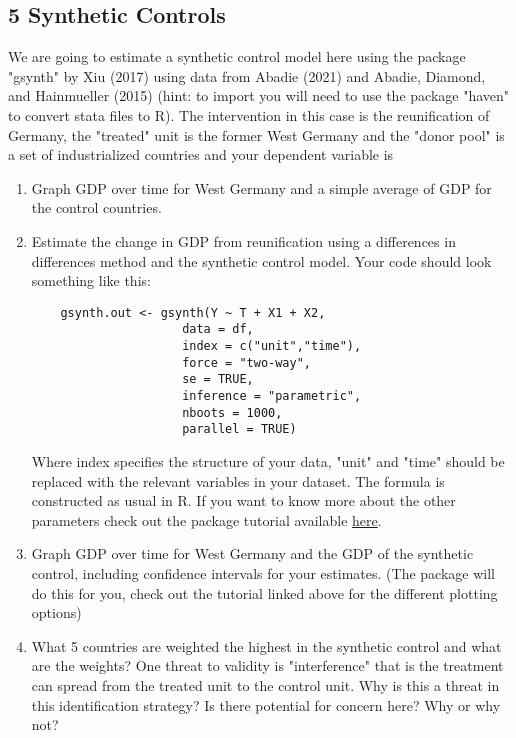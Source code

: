 \documentclass[11pt]{article}
\begin{document}
\subsection*{5 Synthetic Controls}
We are going to estimate a synthetic control model here using the package "gsynth" by Xiu (2017) using data from  Abadie (2021) and Abadie, Diamond, and Hainmueller (2015) (hint: to import you will need to use the package "haven" to convert stata files to R). The intervention in this case is the reunification of Germany, the "treated" unit is the former West Germany and the "donor pool" is a set of industrialized countries and your dependent variable is 

\begin{enumerate}[label=\alph*)]
    \item Graph GDP over time for West Germany and a simple average of GDP for the control countries.
    \item Estimate the change in GDP from reunification using a differences in differences method and the synthetic control model. Your code should look something like this:
    \begin{verbatim}
    gsynth.out <- gsynth(Y ~ T + X1 + X2, 
                     data = df,
                     index = c("unit","time"), 
                     force = "two-way", 
                     se = TRUE, 
                     inference = "parametric",
                     nboots = 1000,
                     parallel = TRUE)
    \end{verbatim}
    Where index specifies the structure of your data,  "unit" and "time" should be replaced with the relevant variables in your dataset. The formula is constructed as usual in R. If you want to know more about the other parameters check out the package tutorial available \href{https://yiqingxu.org/packages/gsynth/articles/tutorial.html}{here}.
    \item Graph GDP over time for West Germany and the GDP of the synthetic control, including confidence intervals for your estimates. (The package will do this for you, check out the tutorial linked above for the different plotting options)
    \item What 5 countries are weighted the highest in the synthetic control and what are the weights? One threat to validity is "interference" that is the treatment can spread from the treated unit to the control unit. Why is this a threat in this identification strategy? Is there potential for concern here? Why or why not?
\end{enumerate}
\end{document}
